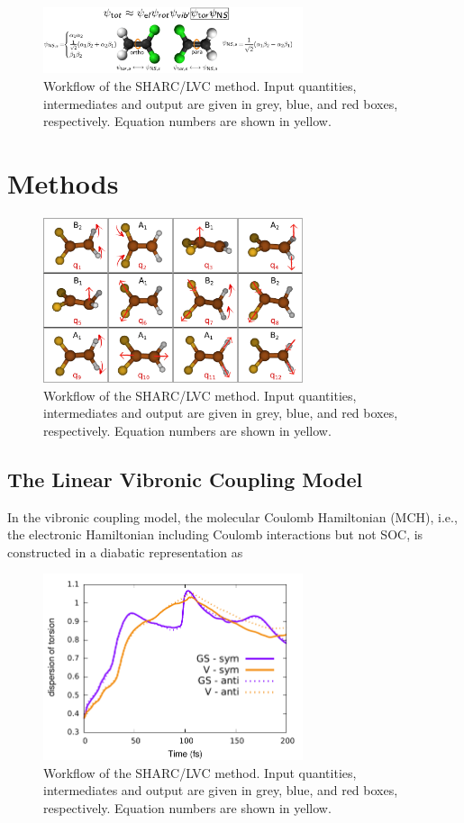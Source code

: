 \documentclass[twoside,twocolumn,9pt]{article}
\begin{document}
\begin{figure}
\includegraphics[width=3in]{dfe}
\caption{Workflow of the SHARC/LVC method. Input quantities, intermediates and output are given in grey, blue, and red boxes, respectively. Equation numbers are shown in yellow.}
\label{fig:flow}
\end{figure}

\section{Methods}

\begin{figure}
\includegraphics[width=3in]{modes}
\caption{Workflow of the SHARC/LVC method. Input quantities, intermediates and output are given in grey, blue, and red boxes, respectively. Equation numbers are shown in yellow.}
\label{fig:flow}
\end{figure}

\subsection{The Linear Vibronic Coupling Model}
In the vibronic coupling model, the molecular Coulomb Hamiltonian (MCH), i.e., the electronic Hamiltonian including Coulomb interactions but not SOC,\cite{Mai2015} is constructed in a diabatic representation as

\begin{figure}
\includegraphics[width=3in]{dr4}
\caption{Workflow of the SHARC/LVC method. Input quantities, intermediates and output are given in grey, blue, and red boxes, respectively. Equation numbers are shown in yellow.}
\label{fig:flow}
\end{figure}
\end{document}
